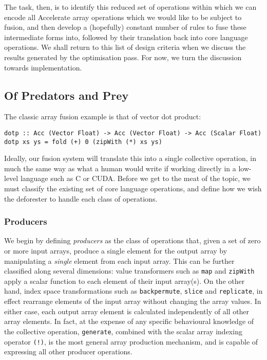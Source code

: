 The task, then, is to identify this reduced set of operations within which we
can encode all Accelerate array operations which we would like to be subject to
fusion, and then develop a (hopefully) constant number of rules to fuse these
intermediate forms into, followed by their translation back into core language
operations. We shall return to this list of design criteria when we discuss the
results generated by the optimisation pass. For now, we turn the discussion
towards implementation.

\subsection{Of Predators and Prey}

The classic array fusion example is that of vector dot product:
%
\begin{lstlisting}[style=haskell,
    label={lst:dotp},
    caption={Vector dot product in Accelerate}]
dotp :: Acc (Vector Float) -> Acc (Vector Float) -> Acc (Scalar Float)
dotp xs ys = fold (+) 0 (zipWith (*) xs ys)
\end{lstlisting}
%
Ideally, our fusion system will translate this into a single collective
operation, in much the same way as what a human would write if working directly
in a low-level language such as C or CUDA. Before we get to the meat of the
topic, we must classify the existing set of core language operations, and define
how we wish the deforester to handle each class of operations.

\subsubsection{Producers}

We begin by defining \emph{producers} as the class of operations
that, given a set of zero or more input arrays, produce a single element for the
output array by manipulating a \emph{single} element from each input array. This
can be further classified along several dimensions: value transformers such as
\texttt{map} and \texttt{zipWith} apply a scalar function to each element of
their input array(s). On the other hand, index space transformations such as
\texttt{backpermute}, \texttt{slice} and \texttt{replicate}, in effect rearrange
elements of the input array without changing the array values. In either case,
each output array element is calculated independently of all other array
elements. In fact, at the expense of any specific behavioural knowledge of the
collective operation, \texttt{generate}, combined with the scalar array
indexing operator \texttt{(!)}, is the most general array production mechanism,
and is capable of expressing all other producer operations.

